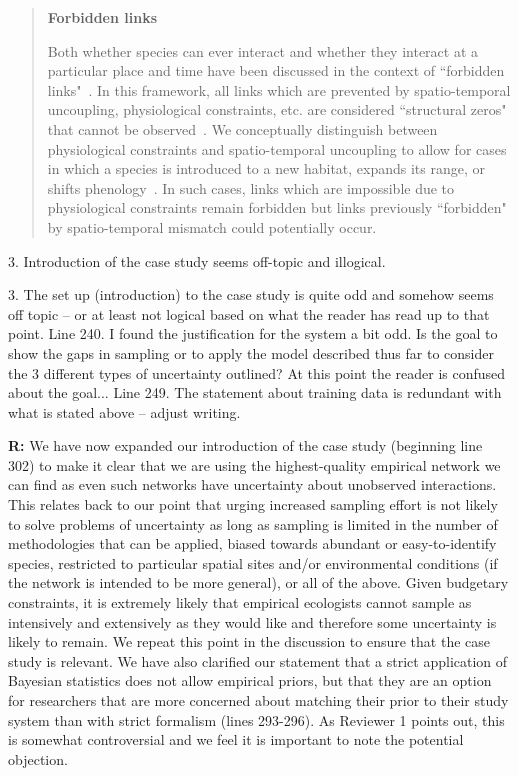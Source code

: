 \documentclass[12pt]{letter}
\newenvironment{refquote}{\bigskip \begin{it}}{\end{it}\smallskip}
\begin{document}
		\begin{quotation}
        \textbf{Forbidden links}

            Both whether species can ever interact and whether they interact at a particular place and time have been discussed in the context of ``forbidden links"~\citep{Jordano2016}. In this framework, all links which are prevented by spatio-temporal uncoupling, physiological constraints, etc. are considered ``structural zeros" that cannot be observed~\citep{Jordano1987,Jordano2016}. We conceptually distinguish between physiological constraints and spatio-temporal uncoupling to allow for cases in which a species is introduced to a new habitat, expands its range, or shifts phenology~\citep{Gravel2013}. In such cases, links which are impossible due to physiological constraints remain forbidden but links previously ``forbidden" by spatio-temporal mismatch could potentially occur.
      \end{quotation}


	3. Introduction of the case study seems off-topic and illogical. 


		\begin{refquote}
		3.      The set up (introduction) to the case study is quite odd and somehow seems off topic – or at least not logical based on what the reader has read up to that point.
		\medskip
		Line 240.  I found the justification for the system a bit odd.  Is the goal to show the gaps in sampling or to apply the model described thus far to consider the 3 different types of uncertainty outlined?  At this point the reader is confused about the goal...
		\medskip
		Line 249.  The statement about training data is redundant with what is stated above – adjust writing.
		\end{refquote}


		\textbf{R:} We have now expanded our introduction of the case study (beginning line 302) to make it clear that we are using the highest-quality empirical network we can find as even such networks have uncertainty about unobserved interactions. This relates back to our point that urging increased sampling effort is not likely to solve problems of uncertainty as long as sampling is limited in the number of methodologies that can be applied, biased towards abundant or easy-to-identify species, restricted to particular spatial sites and/or environmental conditions (if the network is intended to be more general), or all of the above. Given budgetary constraints, it is extremely likely that empirical ecologists cannot sample as intensively and extensively as they would like and therefore some uncertainty is likely to remain. We repeat this point in the discussion to ensure that the case study is relevant. We have also clarified our statement that a strict application of Bayesian statistics does not allow empirical priors, but that they are an option for researchers that are more concerned about matching their prior to their study system than with strict formalism (lines 293-296). As Reviewer 1 points out, this is somewhat controversial and we feel it is important to note the potential objection.
\end{document}
